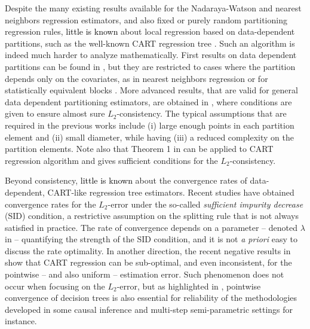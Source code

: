 \documentclass[paper=a4, fontsize=11pt]{scrartcl}
\newcommand{\rev}[1]{\textcolor{black}{#1}}
\begin{document}
%
Despite the many existing results available for the Nadaraya-Watson and nearest neighbors regression estimators, and also fixed or purely random partitioning regression rules, \rev{little is known} about local regression based on data-dependent partitions, such as the well-known CART regression tree \cite{breiman1984classification}. Such an algorithm is indeed much harder to analyze mathematically.
First results on data dependent partitions can be found in \cite{stone1977consistent}, but they are restricted to cases where the partition depends only on the covariates, as in nearest neighbors regression or for statistically equivalent blocks \cite{anderson}. 
More advanced results, that are valid for general data dependent partitioning estimators, are obtained in \cite{gordon1980consistent,breiman1984classification,nobel}, where conditions are given to ensure almost sure $L_2$-consistency. The typical assumptions that are required in the previous works include (i) large enough points in each partition element and (ii) small diameter, while having (iii) a reduced complexity on the partition elements. Note also that Theorem 1 in \cite{scornet2015consistency} can be applied to CART regression algorithm and gives sufficient conditions for the $L_2$-consistency. 


Beyond consistency, \rev{little is known} about the convergence rates of data-dependent, CART-like regression tree estimators. Recent studies  \cite{chi2022asymptotic, mazumder2024convergence} have obtained convergence rates for the $L_2$-error under the so-called \textit{sufficient impurity decrease} (SID) condition,  a restrictive assumption on the splitting rule that is not always satisfied in practice. The rate of convergence depends on a parameter -- denoted $\lambda$ in \cite{ mazumder2024convergence} -- quantifying the strength of the SID condition, and it is not \textit{a priori} easy to discuss the rate optimality. %
In another direction, the recent negative results in \cite{cattaneo2022pointwise} show that CART regression can be sub-optimal, and even inconsistent, for the pointwise -- and also uniform -- estimation error. Such phenomenon does not occur when focusing on the $L_2$-error, but as highlighted in \cite{cattaneo2022pointwise}, pointwise convergence of decision trees is also essential for reliability of the methodologies developed in some causal inference and multi-step semi-parametric settings for instance. 
\end{document}
